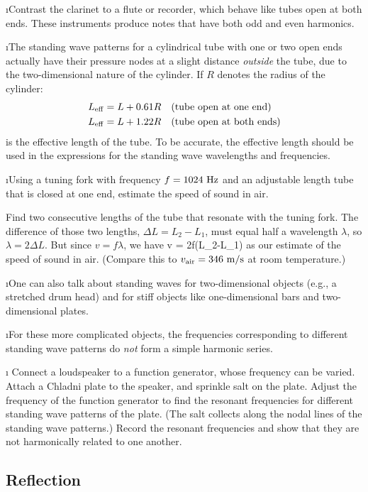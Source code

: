 \i \ex Contrast the clarinet to a 
flute or recorder, which behave like tubes open
at both ends.
These instruments produce notes that have both
odd and even harmonics.

\i The standing wave patterns for a cylindrical 
tube with one or two open ends actually have their 
pressure nodes at a slight distance {\em outside} 
the tube, due to the two-dimensional nature of the cylinder.
If $R$ denotes the radius of the cylinder:
%
\begin{align}
&L_{\rm eff} = L + 0.61 R
\quad
({\rm tube\ open\ at\ one\ end})
\\
&L_{\rm eff} = L + 1.22 R
\quad
({\rm tube\ open\ at\ both\ ends})
\end{align}
%
is the effective length of the tube.
To be accurate, the effective length should be 
used in the expressions for the standing wave
wavelengths and frequencies.

\i \demo Using a tuning fork with frequency
$f=1024~{\rm Hz}$ and an adjustable length tube 
that is closed at one end,
estimate the speed of sound in air.

Find two consecutive lengths of the tube that 
resonate with the tuning fork.
The difference of those two lengths,
$\Delta L = L_2-L_1$, 
must equal half a wavelength $\lambda$, so
$\lambda = 2\Delta L$.
But since $v=f\lambda$, we have
%
\be
v = 2f(L_2-L_1)
\ee
%
as our estimate of the speed of sound in air.
(Compare this to $v_{\rm air}=346~{\rm m/s}$ at room temperature.)

\i One can also talk about standing waves for two-dimensional
objects (e.g., a stretched drum head) and for stiff objects
like one-dimensional bars and two-dimensional plates.

\i For these more complicated objects, the frequencies
corresponding to different standing wave patterns do 
{\em not} form a simple harmonic series.

\i \demo 
Connect a loudspeaker to a function generator, whose frequency 
can be varied.
Attach a Chladni plate to the speaker, and sprinkle salt on 
the plate.
Adjust the frequency of the function generator
to find the resonant frequencies for
different standing wave patterns of the plate.
(The salt collects along the nodal lines of the standing wave
patterns.)
Record the resonant frequencies and show that they are not 
harmonically related to one another.

\ei

\subsection{Reflection}
\bi

